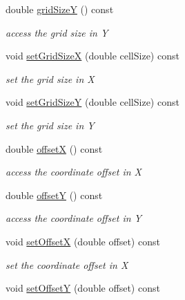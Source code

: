 \begin{DoxyCompactItemize}
double \hyperlink{class_d_d4hep_1_1_geometry_1_1_cartesian_grid_x_y_a3021db1724740a17be12ccfcf90d24e1}{gridSizeY} () const 
\begin{DoxyCompactList}\small\item\em access the grid size in Y \item\end{DoxyCompactList}\item 
void \hyperlink{class_d_d4hep_1_1_geometry_1_1_cartesian_grid_x_y_ad0f17de0932fd9fb1f0381725bee635a}{setGridSizeX} (double cellSize) const 
\begin{DoxyCompactList}\small\item\em set the grid size in X \item\end{DoxyCompactList}\item 
void \hyperlink{class_d_d4hep_1_1_geometry_1_1_cartesian_grid_x_y_ad688789df1c8ec07e14090030a0ac708}{setGridSizeY} (double cellSize) const 
\begin{DoxyCompactList}\small\item\em set the grid size in Y \item\end{DoxyCompactList}\item 
double \hyperlink{class_d_d4hep_1_1_geometry_1_1_cartesian_grid_x_y_adb38a4e807922c1992ed280738e5a262}{offsetX} () const 
\begin{DoxyCompactList}\small\item\em access the coordinate offset in X \item\end{DoxyCompactList}\item 
double \hyperlink{class_d_d4hep_1_1_geometry_1_1_cartesian_grid_x_y_aad5782f732bffc9d6a6eb4abc2142d5c}{offsetY} () const 
\begin{DoxyCompactList}\small\item\em access the coordinate offset in Y \item\end{DoxyCompactList}\item 
void \hyperlink{class_d_d4hep_1_1_geometry_1_1_cartesian_grid_x_y_a72c916a5a3367617353ae2618b87fbf0}{setOffsetX} (double offset) const 
\begin{DoxyCompactList}\small\item\em set the coordinate offset in X \item\end{DoxyCompactList}\item 
void \hyperlink{class_d_d4hep_1_1_geometry_1_1_cartesian_grid_x_y_aaa47fc94a51e4c00b1aeebba4a9e852c}{setOffsetY} (double offset) const 

\end{DoxyCompactItemize}
